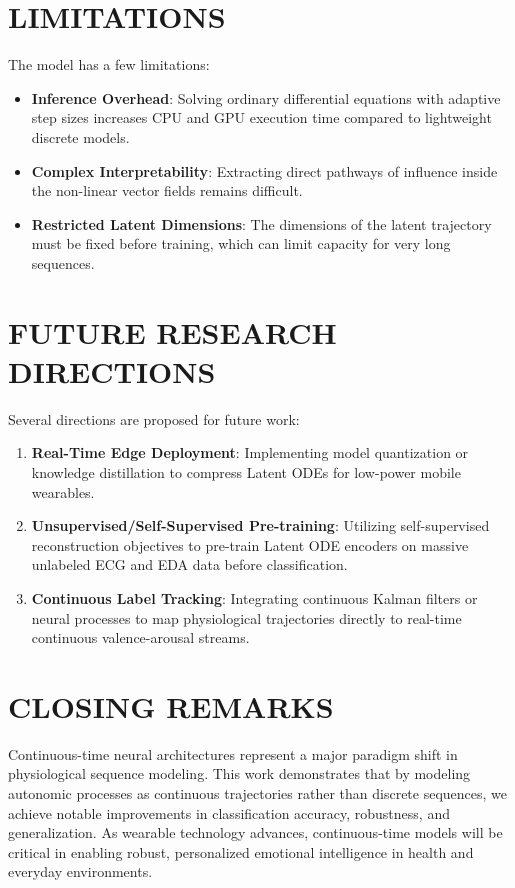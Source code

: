 \documentclass[12pt, a4paper]{report}
\numberwithin{equation}{chapter}
\begin{document}
\section{LIMITATIONS}
The model has a few limitations:
\begin{itemize}
    \item \textbf{Inference Overhead}: Solving ordinary differential equations with adaptive step sizes increases CPU and GPU execution time compared to lightweight discrete models.
    \item \textbf{Complex Interpretability}: Extracting direct pathways of influence inside the non-linear vector fields remains difficult.
    \item \textbf{Restricted Latent Dimensions}: The dimensions of the latent trajectory must be fixed before training, which can limit capacity for very long sequences.
\end{itemize}

\section{FUTURE RESEARCH DIRECTIONS}
Several directions are proposed for future work:
\begin{enumerate}
    \item \textbf{Real-Time Edge Deployment}: Implementing model quantization or knowledge distillation to compress Latent ODEs for low-power mobile wearables.
    \item \textbf{Unsupervised/Self-Supervised Pre-training}: Utilizing self-supervised reconstruction objectives to pre-train Latent ODE encoders on massive unlabeled ECG and EDA data before classification.
    \item \textbf{Continuous Label Tracking}: Integrating continuous Kalman filters or neural processes to map physiological trajectories directly to real-time continuous valence-arousal streams.
\end{enumerate}

\section{CLOSING REMARKS}
Continuous-time neural architectures represent a major paradigm shift in physiological sequence modeling. This work demonstrates that by modeling autonomic processes as continuous trajectories rather than discrete sequences, we achieve notable improvements in classification accuracy, robustness, and generalization. As wearable technology advances, continuous-time models will be critical in enabling robust, personalized emotional intelligence in health and everyday environments.
\end{document}
